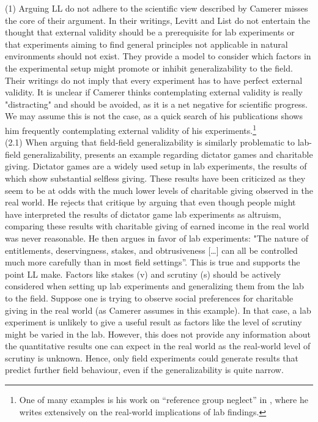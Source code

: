 \documentclass{article}
\begin{document}
(1) 	Arguing LL do not adhere to the scientific view described by Camerer misses the core of their argument. In their writings, Levitt and List do not entertain the thought that external validity should be a prerequisite for lab experiments or that experiments aiming to find general principles not applicable in natural environments should not exist. They provide a model to consider which factors in the experimental setup might promote or inhibit generalizability to the field. Their writings do not imply that every experiment has to have perfect external validity. It is unclear if Camerer thinks contemplating external validity is really "distracting" and should be avoided, as it is a net negative for scientific progress. We may assume this is not the case, as a quick search of his publications shows him frequently contemplating external validity of his experiments.\footnote{One of many examples is his work on “reference group neglect” in \cite{Camerer.1999}, where he writes extensively on the real-world implications of lab findings.}
\\

(2.1) 	When arguing that field-field generalizability is similarly problematic to lab-field generalizability, \citep{Camerer.2011} presents an example regarding dictator games and charitable giving. Dictator games are a widely used setup in lab experiments, the results of which show substantial selfless giving. These results have been criticized as they seem to be at odds with the much lower levels of charitable giving observed in the real world. He rejects that critique by arguing that even though people might have interpreted the results of dictator game lab experiments as altruism, comparing these results with charitable giving of earned income in the real world was never reasonable. He then argues in favor of lab experiments: "The nature of entitlements, deservingness, stakes, and obtrusiveness […] can all be controlled much more carefully than in most field settings”. This is true and supports the point LL make. Factors like stakes (v) and scrutiny (s) should be actively considered when setting up lab experiments and generalizing them from the lab to the field. Suppose one is trying to observe social preferences for charitable giving in the real world (as Camerer assumes in this example). In that case, a lab experiment is unlikely to give a useful result as factors like the level of scrutiny might be varied in the lab. However, this does not provide any information about the quantitative results one can expect in the real world as the real-world level of scrutiny is unknown. Hence, only field experiments could generate results that predict further field behaviour, even if the generalizability is quite narrow.
\\
\end{document}
